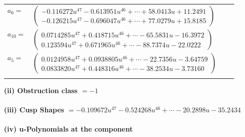 \documentclass[1p]{elsarticle_modified}
\theoremstyle{definition}
\begin{document}
\begin{tabular}{m{7pt} m{180pt} m{7pt} m{180pt} }
\flushright $a_{6}=$&$\begin{pmatrix}-0.116272 u^{47}-0.613951 u^{46}+\cdots+58.0413 u+11.2491\\-0.126215 u^{47}-0.696047 u^{46}+\cdots+77.0279 u+15.8185\end{pmatrix}$ \\
\flushright $a_{10}=$&$\begin{pmatrix}0.0714285 u^{47}+0.418715 u^{46}+\cdots-65.5831 u-16.3972\\0.123594 u^{47}+0.671965 u^{46}+\cdots-88.7374 u-22.0222\end{pmatrix}$ \\
\flushright $a_{5}=$&$\begin{pmatrix}0.0124958 u^{47}+0.0938805 u^{46}+\cdots-22.7356 u-3.64759\\0.0833820 u^{47}+0.448316 u^{46}+\cdots-38.2534 u-3.73160\end{pmatrix}$\\&\end{tabular}
\flushleft \textbf{(ii) Obstruction class $= -1$}\\~\\
\flushleft \textbf{(iii) Cusp Shapes $= -0.109672 u^{47}-0.524268 u^{46}+\cdots-20.2898 u-35.2434$}\\~\\
\newpage\renewcommand{\arraystretch}{1}
\flushleft \textbf{(iv) u-Polynomials at the component}\newline \\
\end{document}
